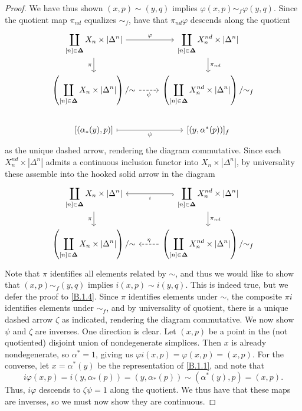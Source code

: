 \begin{proof}
	We have thus shown $(x,p)\sim (y,q)$ implies $\varphi(x,p)\sim_f \varphi(y,q)$. Since the quotient map $\pi_{nd} $ equalizes $\sim _f$, have that $\pi_{nd} \varphi$ descends along the quotient
	\[\begin{tikzcd}
	{\displaystyle{\coprod_{[n]\in\boldsymbol{\Delta}}X_n\times\left|\Delta^n\right|}} & {\displaystyle{\coprod_{[n]\in\boldsymbol{\Delta}}X_n^{nd}\times\left|\Delta^n\right|}} \\
	{\displaystyle{\left(\coprod_{[n]\in\boldsymbol{\Delta}}X_n\times\left|\Delta^n\right|\right)/\tildesim}} & {\displaystyle{\left(\coprod_{[n]\in\boldsymbol{\Delta}}X_n^{nd}\times\left|\Delta^n\right|\right)/\tildesim_f}} \\
	{[(\alpha_*(y),p)]} & {[(y,\alpha^*(p))]_f}
	\arrow["\varphi", from=1-1, to=1-2]
	\arrow["\pi"', from=1-1, to=2-1]
	\arrow["{\pi_{nd}}", from=1-2, to=2-2]
	\arrow[dashed, " \psi "',  from=2-1, to=2-2]
	\arrow["\psi"', maps to, from=3-1, to=3-2]
	\end{tikzcd}\]
	as the unique dashed arrow, rendering the diagram commutative. Since each $X_n^{nd} \times \left| \Delta^n \right|$ admits a continuous inclusion functor into $X_n\times \left| \Delta^n \right| $, by universality these assemble into the hooked solid arrow in the diagram
	\[\begin{tikzcd}
	{\displaystyle{\coprod_{[n]\in\boldsymbol{\Delta}}X_n\times\left|\Delta^n\right|}} & {\displaystyle{\coprod_{[n]\in\boldsymbol{\Delta}}X_n^{nd}\times\left|\Delta^n\right|}} \\
	{\displaystyle{\left(\coprod_{[n]\in\boldsymbol{\Delta}}X_n\times\left|\Delta^n\right|\right)/\tildesim}} & {\displaystyle{\left(\coprod_{[n]\in\boldsymbol{\Delta}}X_n^{nd}\times\left|\Delta^n\right|\right)/\tildesim_f}}
	\arrow["\pi"', from=1-1, to=2-1]
	\arrow["i", hook, from=1-2, to=1-1]
	\arrow["{\pi_{nd}}", from=1-2, to=2-2]
	\arrow[" \eta "', dashed, from=2-2, to=2-1]
	\end{tikzcd}\]
	Note that $\pi$ identifies all elements related by $\sim $, and thus we would like to show that $(x,p)\sim_f (y,q)$ implies $i(x,p)\sim i(y,q)$. This is indeed true, but we defer the proof to \cref{B.1.4}. Since $\pi$ identifies elements under $\sim$, the composite $\pi i$ identifies elements under $\sim _f$, and by universality of quotient, there is a unique dashed arrow $\zeta$ as indicated, rendering the diagram commutative. We now show $\psi$ and $\zeta$ are inverses. One direction is clear. Let $(x,p)$ be a point in the (not quotiented) disjoint union of nondegenerate simplices. Then $x$ is already nondegenerate, so $\alpha^*=1$, giving us $\varphi i(x,p)=\varphi(x,p)=(x,p)$. For the converse, let $x=\alpha^*(y)$ be the representation of \cref{B.1.1}, and note that
	\[
		i\varphi(x,p)=i(y,\alpha_*(p))=(y,\alpha_*(p))\sim(\alpha^*(y),p)=(x,p)
	.\]
	Thus, $i\varphi$ descends to $\zeta\psi=1$ along the quotient. We thus have that these maps are inverses, so we must now show they are continuous.


\end{proof}
